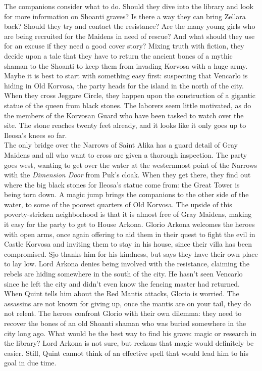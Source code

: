 The companions consider what to do. Should they dive into the library and look for more information on Shoanti graves? Is there a way they can bring Zellara back? Should they try and contact the resistance? Are the many young girls who are being recruited for the Maidens in need of rescue? And what should they use for an excuse if they need a good cover story? Mixing truth with fiction, they decide upon a tale that they have to return the ancient bones of a mythic shaman to the Shoanti to keep them from invading Korvosa with a huge army.\\

Maybe it is best to start with something easy first: suspecting that Vencarlo is hiding in Old Korvosa, the party heads for the island in the north of the city. When they cross Jeggare Circle, they happen upon the construction of a gigantic statue of the queen from black stones. The laborers seem little motivated, as do the members of the Korvosan Guard who have been tasked to watch over the site. The stone reaches twenty feet already, and it looks like it only goes up to Ileosa's knees so far.\\

The only bridge over the Narrows of Saint Alika has a guard detail of Gray Maidens and all who want to cross are given a thorough inspection. The party goes west, wanting to get over the water at the westernmost point of the Narrows with the {\itshape Dimension Door} from Puk's cloak. When they get there, they find out where the big black stones for Ileosa's statue come from: the Great Tower is being torn down. A magic jump brings the companions to the other side of the water, to some of the poorest quarters of Old Korvosa. The upside of this poverty-stricken neighborhood is that it is almost free of Gray Maidens, making it easy for the party to get to House Arkona. Glorio Arkona welcomes the heroes with open arms, once again offering to aid them in their quest to fight the evil in Castle Korvosa and inviting them to stay in his house, since their villa has been compromised. Sjo thanks him for his kindness, but says they have their own place to lay low. Lord Arkona denies being involved with the resistance, claiming the rebels are hiding somewhere in the south of the city. He hasn't seen Vencarlo since he left the city and didn't even know the fencing master had returned. When Quint tells him about the Red Mantis attacks, Glorio is worried. The assassins are not known for giving up, once the mantis are on your tail, they do not relent. The heroes confront Glorio with their own dilemma: they need to recover the bones of an old Shoanti shaman who was buried somewhere in the city long ago. What would be the best way to find his grave: magic or research in the library? Lord Arkona is not sure, but reckons that magic would definitely be easier. Still, Quint cannot think of an effective spell that would lead him to his goal in due time.\\

